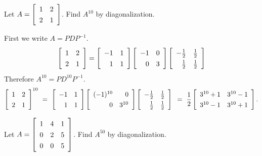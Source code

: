 \documentclass{ximera}
\author{Zack Reed}
\begin{document}
    \begin{problem}
      Let $A = \startmat{rr}
        1 & 2 \\
        2 & 1
      \stopmat$. Find $A^{10}$ by diagonalization.
      \begin{solution}
        First we write $A = PDP^{-1}$.
        \begin{equation*}
          \def\arraystretch{1.3}
          \startmat{rr}
            1 & 2 \\
            2 & 1
          \stopmat
          =
          \startmat{rr}
            -1 & 1 \\
            1 & 1
          \stopmat
          \startmat{rr}
            -1 & 0 \\
            0 & 3
          \stopmat
          \startmat{rr}
            -\frac{1}{2} & \frac{1}{2} \\
            \frac{1}{2} & \frac{1}{2}
          \stopmat
        \end{equation*}
        Therefore $A^{10} = PD^{10}P^{-1}$.
        \begin{equation*}
          \def\arraystretch{1.3}
          \startmat{rr}
            1 & 2 \\
            2 & 1
          \stopmat^{10}
          ~=~
          \startmat{rr}
            -1 & 1 \\
            1 & 1
          \stopmat
          \startmat{rr}
            (-1)^{10} & 0 \\
            0 & 3^{10}
          \stopmat
          \startmat{rr}
            -\frac{1}{2} & \frac{1}{2} \\
            \frac{1}{2} & \frac{1}{2}
          \stopmat \\
          ~=~
          \frac{1}{2}\startmat{cc}
            3^{10}+1 & 3^{10}-1 \\
            3^{10}-1 & 3^{10}+1
          \stopmat.
        \end{equation*}
      \end{solution}
    \end{problem}
    
    \begin{problem}
      Let $A = \startmat{rrr}
        1 & 4 & 1 \\
        0 & 2 & 5 \\
        0 & 0 & 5
      \stopmat$. Find $A^{50}$ by diagonalization.
    \end{problem}
    
\end{document}
